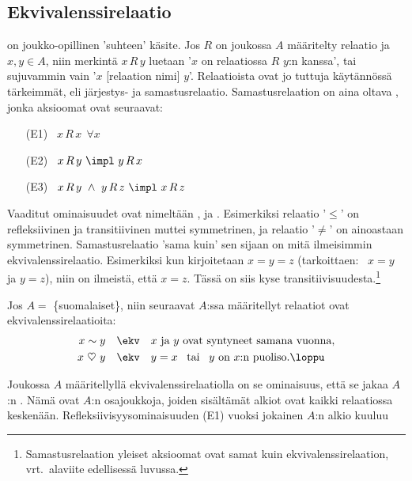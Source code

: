 \subsection{Ekvivalenssirelaatio}
%

%
 on joukko-opillinen 'suhteen' käsite. Jos $R$ on joukossa $A$ määritelty relaatio
ja $x,y \in A$, niin merkintä $x\,R\,y$ luetaan '$x$ on relaatiossa $R$ $y$:n kanssa', tai
sujuvammin vain '$x$ [relaation nimi] $y$'. Relaatioista ovat jo tuttuja käytännössä tärkeimmät, 
eli järjestys- ja samastusrelaatio.
%
Samastusrelaation on aina oltava , jonka aksioomat ovat seuraavat:
\begin{itemize}
\item[(E1)] \ $x\,R\,x\ \ \forall x$
\item[(E2)] \ $x\,R\,y\ \impl\ y\,R\,x$
\item[(E3)] \ $x\,R\,y\ \wedge\ y\,R\,z\ \impl\ x\,R\,z$
\end{itemize}
 
%
Vaaditut ominaisuudet ovat nimeltään ,  ja 
. Esimerkiksi relaatio '$\le$' on refleksiivinen ja transitiivinen muttei 
symmetrinen, ja relaatio '$\neq$' on ainoastaan symmetrinen. Samastusrelaatio 'sama kuin' sen 
sijaan on mitä ilmeisimmin ekvivalenssirelaatio. Esimerkiksi kun kirjoitetaan $x=y=z$ 
(tarkoittaen: \ $x=y$ ja $y=z$), niin on ilmeistä, että $x=z$. Tässä on siis kyse 
transitiivisuudesta.\footnote[2]{Samastusrelaation yleiset aksioomat ovat samat kuin 
ekvivalenssirelaation, vrt.\ alaviite edellisessä luvussa.}
\begin{Exa} Jos $A =$ \{suomalaiset\}, niin seuraavat $A$:ssa määritellyt relaatiot ovat
ekvivalenssirelaatioita:
\begin{align*}
x \sim y         \quad &\ekv \quad \text{$x$ ja $y$ ovat syntyneet samana vuonna}, \\
x\ \heartsuit\ y \quad &\ekv \quad \text{$y=x\,\ $ tai $\,\ y$ on $x$:n puoliso}. \loppu
\end{align*}
\end{Exa}
Joukossa $A$ määritellyllä ekvivalenssirelaatiolla on se ominaisuus, että se jakaa $A$:n
%
. Nämä ovat $A$:n osajoukkoja, joiden sisältämät alkiot ovat kaikki
relaatiossa keskenään. Refleksiivisyysominaisuuden (E1) vuoksi jokainen $A$:n alkio kuuluu 

